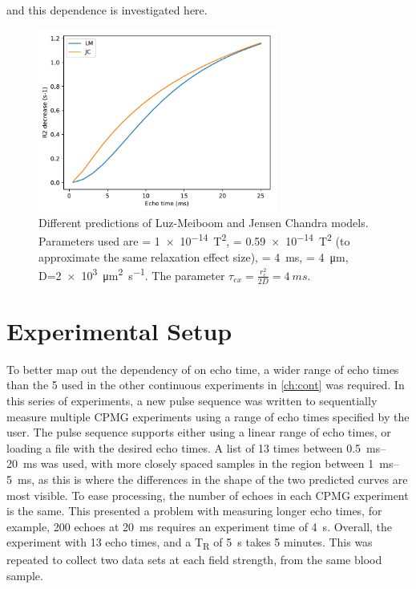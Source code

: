 and this dependence is investigated here.

\begin{figure}[tb]
\centering
\includegraphics[width=0.7\textwidth]{figures/diffmodels/JCLMtheorycomparison.pdf}
\caption[Different predictions of Luz-Meiboom and Jensen Chandra models]{Different predictions of Luz-Meiboom and Jensen Chandra models. Parameters used are \Gzero = \SI{1e-14}{T^2}, \Kzero = \SI{0.59e-14}{T^2} (to approximate the same relaxation effect size), \Texc = \SI{4}{ms}, \rc = \SI{4}{\micro\metre}, D=\SI{2e3}{\micro\metre\squared\per\second}. The parameter $\tau_{ex} = \frac{r_c^2}{2D} = \SI{4}{ms}$.}
\label{fig:dm-JCLMtheory}
\end{figure}

\section{Experimental Setup}
To better map out the dependency of \Ttwo on echo time, a wider range of echo times than the 5 used in the other continuous experiments in \autoref{ch:cont} was required.
In this series of experiments, a new pulse sequence  was written to sequentially measure multiple CPMG experiments using a range of echo times specified by the user.
The pulse sequence supports either using a linear range of echo times, or loading a file with the desired echo times.
A list of 13 times between \SIrange{0.5}{20}{ms} was used, with more closely spaced samples in the region between \SIrange{1}{5}{ms}, as this is where the differences in the shape of the two predicted curves are most visible.
To ease processing, the number of echoes in each CPMG experiment is the same.
This presented a problem with measuring longer echo times, for example, 200 echoes at \SI{20}{ms} requires an experiment time of \SI{4}{\second}.
Overall, the experiment with 13 echo times, and a T\textsubscript{R} of \SI{5}{\second} takes 5 minutes.
This was repeated to collect two data sets at each field strength, from the same blood sample.


